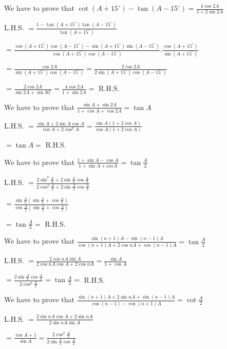 \item We have to prove that $\cot (A + 15^\circ) - \tan(A - 15^\circ) = \frac{4\cos 2A}{1 + 2\sin 2A}$

  L.H.S. $= \frac{1 - \tan(A + 15^\circ)\tan(A - 15^\circ)}{\tan(A + 15^\circ)}$

  $= \frac{\cos(A + 15^\circ)\cos(A - 15^\circ) - \sin(A + 15^\circ)\sin(A - 15^\circ)}{\cos(A + 15^\circ)\cos(A -
    15^\circ)}.\frac{\cos(A + 15^\circ)}{\sin(A + 15^\circ)}$

  $= \frac{\cos 2A}{\sin(A + 15^\circ)\cos(A - 15^\circ)} = \frac{2\cos 2A}{2\sin(A + 15^\circ)\cos(A - 15^\circ)}$

  $= \frac{2\cos 2A}{\sin2A + \sin30^\circ} = \frac{4\cos 2A}{1 + \sin 2A} =$ R.H.S.

\item We have to prove that $\frac{\sin A + \sin2A}{1 + \cos A + \cos 2A} = \tan A$

  L.H.S. $= \frac{\sin A + 2\sin A\cos A}{\cos A + 2\cos^2A} = \frac{\sin A(1 + 2\cos A)}{\cos A(1 + 2\cos A)}$

  $= \tan A =$ R.H.S.

\item We have to prove that $\frac{1 + \sin A - \cos A }{1 + \sin A + cos A} = \tan \frac{A}{2}$

  L.H.S. $= \frac{2\sin^2\frac{A}{2} + 2\sin\frac{A}{2}\cos\frac{A}{2}}{2\cos^2\frac{A}{2} + 2\sin\frac{A}{2}\cos\frac{A}{2}}$

  $= \frac{\sin\frac{A}{2}(\sin\frac{A}{2} + \cos\frac{A}{2})}{\cos\frac{A}{2}(\sin\frac{A}{2} + \cos\frac{A}{2})}$

  $= \tan\frac{A}{2} =$ R.H.S.

\item We have to prove that $\frac{\sin(n + 1)A - \sin(n - 1)A}{\cos(n + 1)A + 2\cos nA + \cos(n - 1)A} = \tan \frac{A}{2}$

  L.H.S. $= \frac{2\cos nA \sin A}{2\cos nA \cos A + 2\cos nA} = \frac{\sin A}{1 + \cos A}$

  $= \frac{2\sin\frac{A}{2}\cos\frac{A}{2}}{2\cos^2\frac{A}{2}} = \tan \frac{A}{2} =$ R.H.S.

\item We have to prove that $\frac{\sin(n + 1)A + 2\sin nA + \sin(n - 1)A}{\cos(n - 1) - \cos(n + 1)A} = \cot \frac{A}{2}$

  L.H.S. $= \frac{2\sin nA\cos A + 2\sin nA}{2\sin nA\sin A}$

  $= \frac{\cos A + 1}{\sin A} = \frac{2\cos^2\frac{A}{2}}{2\sin\frac{A}{2}\cos\frac{A}{2}}$

